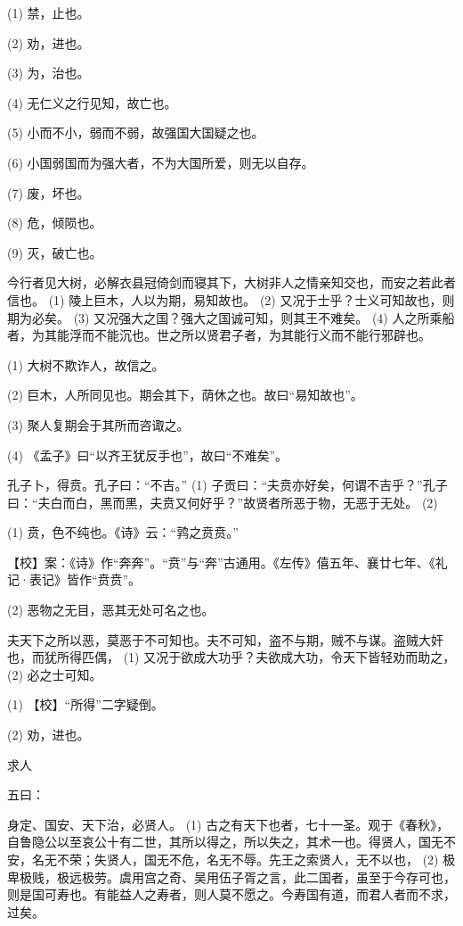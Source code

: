 \documentclass[12pt,UTF8]{ctexbook}
\begin{document}
(1) 禁，止也。

(2) 劝，进也。

(3) 为，治也。

(4) 无仁义之行见知，故亡也。

(5) 小而不小，弱而不弱，故强国大国疑之也。

(6) 小国弱国而为强大者，不为大国所爱，则无以自存。

(7) 废，坏也。

(8) 危，倾陨也。

(9) 灭，破亡也。

今行者见大树，必解衣县冠倚剑而寝其下，大树非人之情亲知交也，而安之若此者信也。 (1) 陵上巨木，人以为期，易知故也。 (2) 又况于士乎？士义可知故也，则期为必矣。 (3) 又况强大之国？强大之国诚可知，则其王不难矣。 (4) 人之所乘船者，为其能浮而不能沉也。世之所以贤君子者，为其能行义而不能行邪辟也。

(1) 大树不欺诈人，故信之。

(2) 巨木，人所同见也。期会其下，荫休之也。故曰“易知故也”。

(3) 聚人复期会于其所而咨诹之。

(4) 《孟子》曰“以齐王犹反手也”，故曰“不难矣”。

孔子卜，得贲。孔子曰：“不吉。” (1) 子贡曰：“夫贲亦好矣，何谓不吉乎？”孔子曰：“夫白而白，黑而黑，夫贲又何好乎？”故贤者所恶于物，无恶于无处。 (2)

(1) 贲，色不纯也。《诗》云：“鹑之贲贲。”

【校】案：《诗》作“奔奔”。“贲”与“奔”古通用。《左传》僖五年、襄廿七年、《礼记·表记》皆作“贲贲”。

(2) 恶物之无目，恶其无处可名之也。

夫天下之所以恶，莫恶于不可知也。夫不可知，盗不与期，贼不与谋。盗贼大奸也，而犹所得匹偶， (1) 又况于欲成大功乎？夫欲成大功，令天下皆轻劝而助之， (2) 必之士可知。

(1) 【校】“所得”二字疑倒。

(2) 劝，进也。





求人


五曰：

身定、国安、天下治，必贤人。 (1) 古之有天下也者，七十一圣。观于《春秋》，自鲁隐公以至哀公十有二世，其所以得之，所以失之，其术一也。得贤人，国无不安，名无不荣；失贤人，国无不危，名无不辱。先王之索贤人，无不以也， (2) 极卑极贱，极远极劳。虞用宫之奇、吴用伍子胥之言，此二国者，虽至于今存可也，则是国可寿也。有能益人之寿者，则人莫不愿之。今寿国有道，而君人者而不求，过矣。
\end{document}
